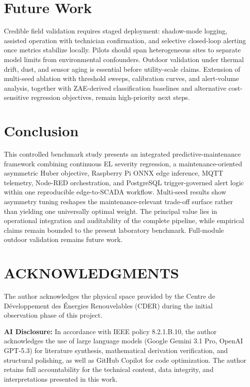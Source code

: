 \documentclass[journal]{IEEEtran}
\begin{document}
\section{Future Work}\label{sec:future}
Credible field validation requires staged deployment: shadow-mode logging, assisted operation with technician confirmation, and selective closed-loop alerting once metrics stabilize locally. Pilots should span heterogeneous sites to separate model limits from environmental confounders. Outdoor validation under thermal drift, dust, and sensor aging is essential before utility-scale claims. Extension of multi-seed ablation with threshold sweeps, calibration curves, and alert-volume analysis, together with ZAE-derived classification baselines and alternative cost-sensitive regression objectives, remain high-priority next steps.

\section{Conclusion}\label{sec:conclusion}
This controlled benchmark study presents an integrated predictive-maintenance framework combining continuous EL severity regression, a maintenance-oriented asymmetric Huber objective, Raspberry Pi ONNX edge inference, MQTT telemetry, Node-RED orchestration, and PostgreSQL trigger-governed alert logic within one reproducible edge-to-SCADA workflow. Multi-seed results show asymmetry tuning reshapes the maintenance-relevant trade-off surface rather than yielding one universally optimal weight. The principal value lies in operational integration and auditability of the complete pipeline, while empirical claims remain bounded to the present laboratory benchmark. Full-module outdoor validation remains future work.

\section*{ACKNOWLEDGMENTS}
The author acknowledges the physical space provided by the Centre de D\'eveloppement des \'Energies Renouvelables (CDER) during the initial observation phase of this project.

\textbf{AI Disclosure:} In accordance with IEEE policy 8.2.1.B.10, the author acknowledges the use of large language models (Google Gemini 3.1 Pro, OpenAI GPT-5.3) for literature synthesis, mathematical derivation verification, and structural polishing, as well as GitHub Copilot for code optimization. The author retains full accountability for the technical content, data integrity, and interpretations presented in this work.
\end{document}
